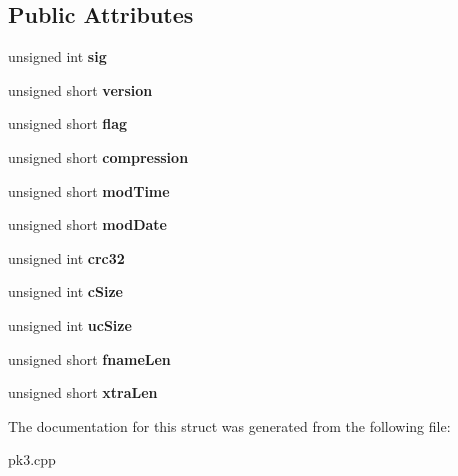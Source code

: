 \subsection*{Public Attributes}
\begin{DoxyCompactItemize}
\item 
unsigned int {\bfseries sig}\hypertarget{structCPK3_1_1TZipLocalHeader_a5dc606f2fbd2b707e2d4a00706031d7b}{}\label{structCPK3_1_1TZipLocalHeader_a5dc606f2fbd2b707e2d4a00706031d7b}

\item 
unsigned short {\bfseries version}\hypertarget{structCPK3_1_1TZipLocalHeader_ae918fc2b1d1969a2163b4053a501f821}{}\label{structCPK3_1_1TZipLocalHeader_ae918fc2b1d1969a2163b4053a501f821}

\item 
unsigned short {\bfseries flag}\hypertarget{structCPK3_1_1TZipLocalHeader_aa6759bd49169c6ebc375fa70a01cec11}{}\label{structCPK3_1_1TZipLocalHeader_aa6759bd49169c6ebc375fa70a01cec11}

\item 
unsigned short {\bfseries compression}\hypertarget{structCPK3_1_1TZipLocalHeader_ac3e63305da6e3682ab0abe9a01d8c49d}{}\label{structCPK3_1_1TZipLocalHeader_ac3e63305da6e3682ab0abe9a01d8c49d}

\item 
unsigned short {\bfseries mod\+Time}\hypertarget{structCPK3_1_1TZipLocalHeader_a7721abc76215b3353157190b25e1e489}{}\label{structCPK3_1_1TZipLocalHeader_a7721abc76215b3353157190b25e1e489}

\item 
unsigned short {\bfseries mod\+Date}\hypertarget{structCPK3_1_1TZipLocalHeader_a2048f04ad8979c8922ef8946f6995bc4}{}\label{structCPK3_1_1TZipLocalHeader_a2048f04ad8979c8922ef8946f6995bc4}

\item 
unsigned int {\bfseries crc32}\hypertarget{structCPK3_1_1TZipLocalHeader_a21700f269854d74e68efa3dab25d01e6}{}\label{structCPK3_1_1TZipLocalHeader_a21700f269854d74e68efa3dab25d01e6}

\item 
unsigned int {\bfseries c\+Size}\hypertarget{structCPK3_1_1TZipLocalHeader_a2155ea904fe9f9502dc1517846113b27}{}\label{structCPK3_1_1TZipLocalHeader_a2155ea904fe9f9502dc1517846113b27}

\item 
unsigned int {\bfseries uc\+Size}\hypertarget{structCPK3_1_1TZipLocalHeader_aded5da97957636ecfcb070f7e879b63e}{}\label{structCPK3_1_1TZipLocalHeader_aded5da97957636ecfcb070f7e879b63e}

\item 
unsigned short {\bfseries fname\+Len}\hypertarget{structCPK3_1_1TZipLocalHeader_aa4cb5303df05362ffd368c40b27cec54}{}\label{structCPK3_1_1TZipLocalHeader_aa4cb5303df05362ffd368c40b27cec54}

\item 
unsigned short {\bfseries xtra\+Len}\hypertarget{structCPK3_1_1TZipLocalHeader_af64bfdf00b0d169a7eb554f81591ea88}{}\label{structCPK3_1_1TZipLocalHeader_af64bfdf00b0d169a7eb554f81591ea88}

\end{DoxyCompactItemize}


The documentation for this struct was generated from the following file\+:\begin{DoxyCompactItemize}
\item 
pk3.\+cpp\end{DoxyCompactItemize}
